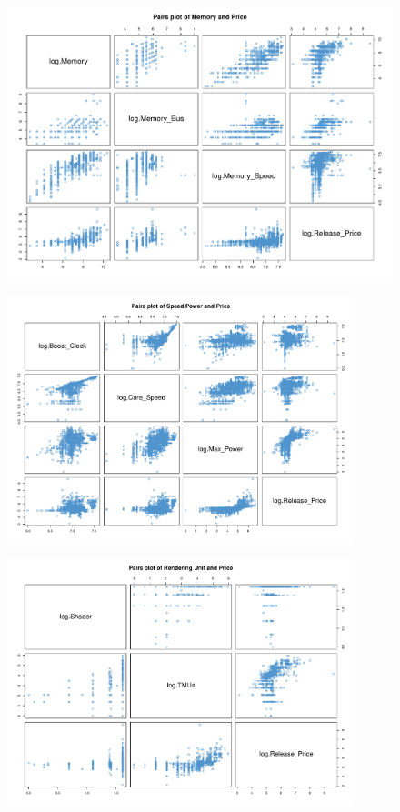 \documentclass[a4paper]{article}
\begin{document}
\begin{figure}[H]
    \centering
    \includegraphics[keepaspectratio, width=1\textwidth, height=1\textheight]{Visualization/Pairs/mem_price.pdf}
\end{figure}
\begin{figure}[H]
    \centering
    \includegraphics[keepaspectratio, width=0.9\textwidth, height=1\textheight]{Visualization/Pairs/speed_power_price.pdf}
\end{figure}
\begin{figure}[H]
    \centering
    \includegraphics[keepaspectratio, width=0.9\textwidth, height=1\textheight]{Visualization/Pairs/rendering_price.pdf}
\end{figure}
\end{document}

